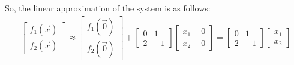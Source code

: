 \begin{enumerate}
{        So, the linear approximation of the system is as follows:
        \begin{align*}
        \begin{bmatrix}
            f_1(\vec{x}) \\
            f_2(\vec{x})
        \end{bmatrix} \approx
        \begin{bmatrix}
            f_1(\vec{0}) \\
            f_2(\vec{0})
        \end{bmatrix} +
        \begin{bmatrix}
            0 & 1 \\
            2 & -1
        \end{bmatrix}
        \begin{bmatrix}
            x_1 - 0 \\
            x_2 - 0
        \end{bmatrix} =
        \begin{bmatrix}
            0 & 1 \\
            2 & -1
        \end{bmatrix}
        \begin{bmatrix}
            x_1 \\
            x_2
        \end{bmatrix}
    \end{align*}
    }
\end{enumerate}
